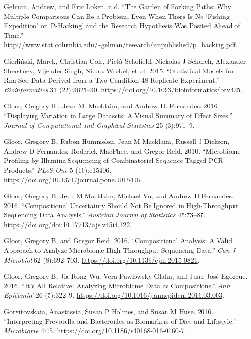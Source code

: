 \documentclass[onecolumn]{book}
\theoremstyle{definition}
\theoremstyle{definition}
\theoremstyle{definition}
\theoremstyle{remark}
\begin{document}
\leavevmode\hypertarget{ref-forking:2013}{}%
Gelman, Andrew, and Eric Loken. n.d. ``The Garden of Forking Paths: Why
Multiple Comparisons Can Be a Problem, Even When There Is No `Fishing
Expedition' or `P-Hacking' and the Research Hypothesis Was Posited Ahead
of Time.''
\url{http://www.stat.columbia.edu/~gelman/research/unpublished/p_hacking.pdf}.

\leavevmode\hypertarget{ref-Gierlinski:2015aa}{}%
Gierliński, Marek, Christian Cole, Pietà Schofield, Nicholas J Schurch,
Alexander Sherstnev, Vijender Singh, Nicola Wrobel, et al. 2015.
``Statistical Models for Rna-Seq Data Derived from a Two-Condition
48-Replicate Experiment.'' \emph{Bioinformatics} 31 (22):3625--30.
\url{https://doi.org/10.1093/bioinformatics/btv425}.

\leavevmode\hypertarget{ref-Gloor:2015}{}%
Gloor, Gregory B., Jean M. Macklaim, and Andrew D. Fernandes. 2016.
``Displaying Variation in Large Datasets: A Visual Summary of Effect
Sizes.'' \emph{Journal of Computational and Graphical Statistics} 25
(3):971--9.

\leavevmode\hypertarget{ref-Gloor:2010}{}%
Gloor, Gregory B, Ruben Hummelen, Jean M Macklaim, Russell J Dickson,
Andrew D Fernandes, Roderick MacPhee, and Gregor Reid. 2010.
``Microbiome Profiling by Illumina Sequencing of Combinatorial
Sequence-Tagged PCR Products.'' \emph{PLoS One} 5 (10):e15406.
\url{https://doi.org/10.1371/journal.pone.0015406}.

\leavevmode\hypertarget{ref-gloorAJS:2016}{}%
Gloor, Gregory B, Jean M Macklaim, Michael Vu, and Andrew D Fernandes.
2016. ``Compositional Uncertainty Should Not Be Ignored in
High-Throughput Sequencing Data Analysis.'' \emph{Austrian Journal of
Statistics} 45:73--87. \url{https://doi.org/doi:10.17713/ajs.v45i4.122}.

\leavevmode\hypertarget{ref-Gloor:2016cjm}{}%
Gloor, Gregory B, and Gregor Reid. 2016. ``Compositional Analysis: A
Valid Approach to Analyze Microbiome High-Throughput Sequencing Data.''
\emph{Can J Microbiol} 62 (8):692--703.
\url{https://doi.org/10.1139/cjm-2015-0821}.

\leavevmode\hypertarget{ref-gloor2016s}{}%
Gloor, Gregory B, Jia Rong Wu, Vera Pawlowsky-Glahn, and Juan José
Egozcue. 2016. ``It's All Relative: Analyzing Microbiome Data as
Compositions.'' \emph{Ann Epidemiol} 26 (5):322--9.
\url{https://doi.org/10.1016/j.annepidem.2016.03.003}.

\leavevmode\hypertarget{ref-Gorvitovskaia:2016aa}{}%
Gorvitovskaia, Anastassia, Susan P Holmes, and Susan M Huse. 2016.
``Interpreting Prevotella and Bacteroides as Biomarkers of Diet and
Lifestyle.'' \emph{Microbiome} 4:15.
\url{https://doi.org/10.1186/s40168-016-0160-7}.
\end{document}
